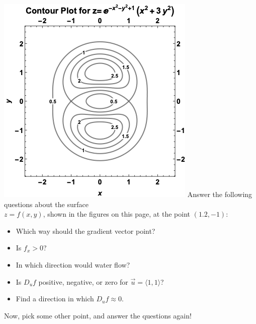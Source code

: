 \begin{enumerate}[{Example} 1: ]
\vspace*{.5in}
\hspace*{-1.5in}
\includegraphics[width=\textwidth]{SurfContour.png}
Answer the following questions about the surface\\ \(z=f(x,y)\), shown in the figures on this page, at the point \((1.2,-1)\):
\begin{itemize}
\item Which way should the gradient vector point?
\item Is \(f_x > 0\)?
\item In which direction would water flow?
\item Is \(D_u f\) positive, negative, or zero for \(\vec{u} = \langle 1,1\rangle\)?
\item Find a direction in which \(D_u f \approx 0\).
\end{itemize}
Now, pick some other point, and answer the questions again!
\end{enumerate}





